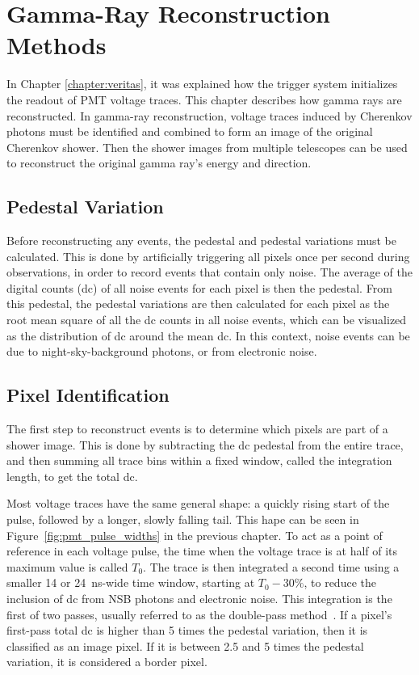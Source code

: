\cleartooddpage[\thispagestyle{empty}]
\newcommand{\ETrue}{$\textrm{E}_{\textrm{True}}$}

\chapter{Gamma-Ray Reconstruction Methods}\label{ch:grrecon}

In Chapter \ref{chapter:veritas}, it was explained how the trigger system initializes the readout of PMT voltage traces.
This chapter describes how gamma rays are reconstructed.
In gamma-ray reconstruction, voltage traces induced by Cherenkov photons must be identified and combined to form an image of the original Cherenkov shower.
Then the shower images from multiple telescopes can be used to reconstruct the original gamma ray's energy and direction.

\section{Pedestal Variation}
  Before reconstructing any events, the pedestal and pedestal variations must be calculated.
  This is done by artificially triggering all pixels once per second during observations, in order to record events that contain only noise.
  The average of the digital counts (dc) of all noise events for each pixel is then the pedestal.
  From this pedestal, the pedestal variations are then calculated for each pixel as the root mean square of all the dc counts in all noise events, which can be visualized as the distribution of dc around the mean dc.
  In this context, noise events can be due to night-sky-background photons, or from electronic noise.

\section{Pixel Identification}
  The first step to reconstruct events is to determine which pixels are part of a shower image.
  This is done by subtracting the dc pedestal from the entire trace, and then summing all trace bins within a fixed window, called the integration length, to get the total dc.

  Most voltage traces have the same general shape: a quickly rising start of the pulse, followed by a longer, slowly falling tail.
  This hape can be seen in Figure~\ref{fig:pmt_pulse_widths} in the previous chapter.
  To act as a point of reference in each voltage pulse, the time when the voltage trace is at half of its maximum value is called $T_{0}$.
  The trace is then integrated a second time using a smaller 14 or \SI{24}{ns}-wide time window, starting at $T_0 - 30\%$, to reduce the inclusion of dc from NSB photons and electronic noise.
  This integration is the first of two passes, usually referred to as the double-pass method~\cite{doublepass}.
  If a pixel's first-pass total dc is higher than 5 times the pedestal variation, then it is classified as an image pixel.
  If it is between 2.5 and 5 times the pedestal variation, it is considered a border pixel.

